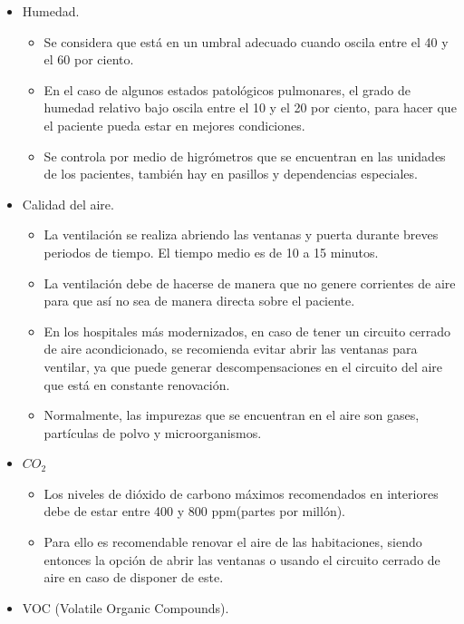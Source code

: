 \begin{itemize}
    	\item Humedad.
    		\begin{itemize}
    			\item Se considera que está en un umbral adecuado cuando oscila entre el 40 y el 60 por ciento.\cite{Calidad_Humedad}
    			\item En el caso de algunos estados patológicos pulmonares, el grado de humedad relativo bajo oscila entre el 10 y el 20 por ciento, para hacer que el paciente pueda estar en mejores condiciones.\cite{Calidad_Humedad}
    			\item Se controla por medio de higrómetros que se encuentran en las unidades de los pacientes, también hay en pasillos y dependencias especiales.\cite{Calidad_Humedad}
    		\end{itemize}
    	\item Calidad del aire.
    		\begin{itemize}
    			\item La ventilación se realiza abriendo las ventanas y puerta durante breves periodos de tiempo. El tiempo medio es de 10 a 15 minutos.\cite{Calidad_aire}
    			\item La ventilación debe de hacerse de manera que no genere corrientes de aire para que así no sea de manera directa sobre el paciente.\cite{Calidad_aire}
    			\item En los hospitales más modernizados, en caso de tener un circuito cerrado de aire acondicionado, se recomienda evitar abrir las ventanas para ventilar, ya que puede generar descompensaciones en el circuito del aire que está en constante renovación.\cite{Calidad_aire}
    			\item Normalmente, las impurezas que se encuentran en el aire son gases, partículas de polvo y microorganismos.\cite{Calidad_aire}
    		\end{itemize}
            \newpage
    	\item $CO_2$
    		\begin{itemize}
    			\item Los niveles de dióxido de carbono máximos recomendados en interiores debe de estar entre 400 y 800 ppm(partes por millón). \cite{CO2_niveles}
    			\item Para ello es recomendable renovar el aire de las habitaciones, siendo entonces la opción de abrir las ventanas o usando el circuito cerrado de aire en caso de disponer de este.
    		\end{itemize}
    	\item VOC (Volatile Organic Compounds).

\end{itemize}
